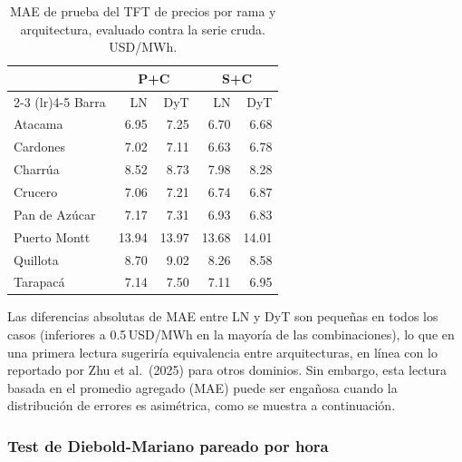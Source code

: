 \begin{table}[htbp]
    \centering
    \small
    \begin{tabular}{lrrrr}
        \toprule
        & \multicolumn{2}{c}{P+C} & \multicolumn{2}{c}{S+C} \\
        \cmidrule(lr){2-3} \cmidrule(lr){4-5}
        Barra & LN & DyT & LN & DyT \\
        \midrule
        Atacama       & 6.95  & 7.25  & 6.70  & 6.68  \\
        Cardones      & 7.02  & 7.11  & 6.63  & 6.78  \\
        Charrúa       & 8.52  & 8.73  & 7.98  & 8.28  \\
        Crucero       & 7.06  & 7.21  & 6.74  & 6.87  \\
        Pan de Azúcar & 7.17  & 7.31  & 6.93  & 6.83  \\
        Puerto Montt  & 13.94 & 13.97 & 13.68 & 14.01 \\
        Quillota      & 8.70  & 9.02  & 8.26  & 8.58  \\
        Tarapacá      & 7.14  & 7.50  & 7.11  & 6.95  \\
        \bottomrule
    \end{tabular}
    \vspace{0.2cm}
    \caption{MAE de prueba del TFT de precios por rama y arquitectura, evaluado contra la serie cruda. USD/MWh.}
    \label{tab:ln_vs_dyt_test}
\end{table}

Las diferencias absolutas de MAE entre LN y DyT son pequeñas en todos los casos (inferiores a 0.5\,USD/MWh en la mayoría de las combinaciones), lo que en una primera lectura sugeriría equivalencia entre arquitecturas, en línea con lo reportado por Zhu et al.\ (2025) para otros dominios. Sin embargo, esta lectura basada en el promedio agregado (MAE) puede ser engañosa cuando la distribución de errores es asimétrica, como se muestra a continuación.

\subsubsection{Test de Diebold-Mariano pareado por hora}
\label{sec:dm_ln_dyt}

